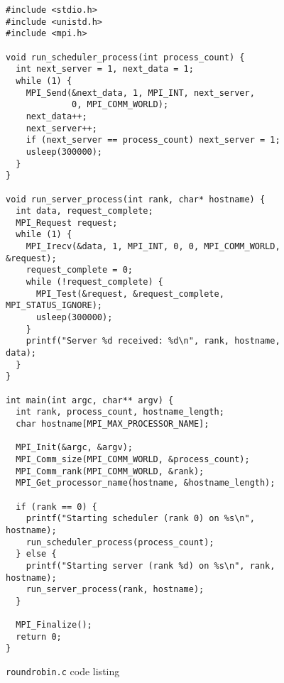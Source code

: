 \begin{figure}
\begin{Verbatim}[frame=single]
#include <stdio.h>
#include <unistd.h>
#include <mpi.h>

void run_scheduler_process(int process_count) {
  int next_server = 1, next_data = 1;
  while (1) {
    MPI_Send(&next_data, 1, MPI_INT, next_server, 
             0, MPI_COMM_WORLD);
    next_data++;
    next_server++;
    if (next_server == process_count) next_server = 1;
    usleep(300000);
  }
}

void run_server_process(int rank, char* hostname) {
  int data, request_complete;
  MPI_Request request;
  while (1) {
    MPI_Irecv(&data, 1, MPI_INT, 0, 0, MPI_COMM_WORLD, &request);
    request_complete = 0;
    while (!request_complete) {
      MPI_Test(&request, &request_complete, MPI_STATUS_IGNORE);
      usleep(300000);
    }
    printf("Server %d received: %d\n", rank, hostname, data);
  }
}

int main(int argc, char** argv) {
  int rank, process_count, hostname_length;
  char hostname[MPI_MAX_PROCESSOR_NAME];

  MPI_Init(&argc, &argv);
  MPI_Comm_size(MPI_COMM_WORLD, &process_count);
  MPI_Comm_rank(MPI_COMM_WORLD, &rank);
  MPI_Get_processor_name(hostname, &hostname_length);

  if (rank == 0) {
    printf("Starting scheduler (rank 0) on %s\n", hostname);
    run_scheduler_process(process_count);
  } else {
    printf("Starting server (rank %d) on %s\n", rank, hostname);
    run_server_process(rank, hostname);
  }

  MPI_Finalize();
  return 0;
}
\end{Verbatim}
    \caption{\texttt{roundrobin.c} code listing}
    \label{code:roundrobin}
\end{figure}